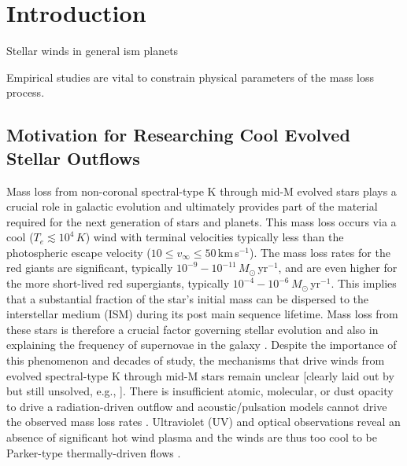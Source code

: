 \chapter{Introduction} \label{chap:1}

Stellar winds in general ism planets

Empirical studies are vital to constrain physical parameters of the mass loss process. 

\pagebreak

\section{Motivation for Researching Cool Evolved Stellar Outflows}\label{sec:1}

Mass loss from non-coronal spectral-type K through mid-M evolved stars plays a crucial role in galactic evolution and ultimately provides part of the material required for the next generation of stars and planets. This mass loss occurs via a cool ($T_{e} \lesssim 10^4\,K$) wind with terminal velocities typically less than the photospheric escape velocity ($10 \leq v_{\infty} \leq 50$\,km\,s$^{-1}$). The mass loss rates for the red giants are significant, typically $10^{-9}-10^{-11}$\,$M_{\odot}$\,yr$^{-1}$, and are even higher for the more short-lived red supergiants, typically $10^{-4}-10^{-6}$\,$M_{\odot}$\,yr$^{-1}$. This implies that a substantial fraction of the star's initial mass can be dispersed to the interstellar medium (ISM) during its post main sequence lifetime. Mass loss from these stars is therefore a crucial factor governing stellar evolution and also in explaining the frequency of supernovae in the galaxy \citep{harper_1996}. Despite the importance of this phenomenon and decades of study, the mechanisms that drive winds from evolved spectral-type K through mid-M stars remain unclear [clearly laid out by \cite{holzer_1985} but still unsolved, e.g., \cite{crowley_2009}]. There is insufficient atomic, molecular, or dust opacity to drive a radiation-driven outflow \citep{zukerman_1995,jones_2008} and acoustic/pulsation models cannot drive the observed mass loss rates \citep{sutmann_1995}. Ultraviolet (UV) and optical observations reveal an absence of significant hot wind plasma and the winds are thus too cool to be Parker-type thermally-driven flows \cite[e.g.,][]{linsky_1979,haisch_1980,ayres_1981}. 

